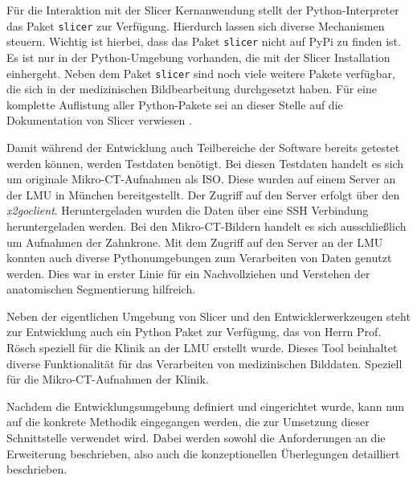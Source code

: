 Für die Interaktion mit der Slicer Kernanwendung stellt der Python-Interpreter das
Paket \texttt{slicer} zur Verfügung. Hierdurch lassen sich diverse Mechanismen steuern.
Wichtig ist hierbei, dass das Paket \texttt{slicer} nicht auf \ac{PyPi} zu finden
ist. Es ist nur in der Python-Umgebung vorhanden, die mit der Slicer Installation
einhergeht. Neben dem Paket \texttt{slicer} sind noch viele weitere Pakete verfügbar,
die sich in der medizinischen Bildbearbeitung durchgesetzt haben. Für eine komplette
Auflistung aller Python-Pakete sei an dieser Stelle auf die Dokumentation von Slicer
verwiesen \citep[vgl.][]{slicer2024}.

Damit während der Entwicklung auch Teilbereiche der Software bereits getestet
werden können, werden Testdaten benötigt. Bei diesen Testdaten handelt es sich
um originale Mikro-\ac{CT}-Aufnahmen als \ac{ISO}. Diese wurden auf einem Server
an der \ac{LMU} in München bereitgestellt. Der Zugriff auf den Server erfolgt über
den \textit{x2goclient}. Heruntergeladen wurden die Daten über eine \ac{SSH}
Verbindung heruntergeladen werden. Bei den Mikro-CT-Bildern handelt es sich ausschließlich
um Aufnahmen der Zahnkrone. Mit dem Zugriff auf den Server an der \ac{LMU} konnten
auch diverse Pythonumgebungen zum Verarbeiten von Daten genutzt werden. Dies war
in erster Linie für ein Nachvollziehen und Verstehen der anatomischen
Segmentierung hilfreich.

Neben der eigentlichen Umgebung von Slicer und den Entwicklerwerkzeugen steht
zur Entwicklung auch ein Python Paket zur Verfügung, das von Herrn Prof. Rösch
speziell für die Klinik an der \ac{LMU} erstellt wurde. Dieses Tool beinhaltet
diverse Funktionalität für das Verarbeiten von medizinischen Bilddaten. Speziell
für die Mikro-\ac{CT}-Aufnahmen der Klinik.

Nachdem die Entwicklungsumgebung definiert und eingerichtet wurde, kann nun auf die
konkrete Methodik eingegangen werden, die zur Umsetzung dieser Schnittstelle
verwendet wird. Dabei werden sowohl die Anforderungen an die Erweiterung beschrieben,
also auch die konzeptionellen Überlegungen detailliert beschrieben.

